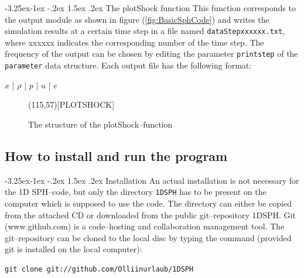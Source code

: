 \documentclass{report}
\makeatletter
\renewcommand\paragraph{\@startsection{paragraph}{4}{\z@}%
  {-3.25ex\@plus -1ex \@minus -.2ex}%
  {1.5ex \@plus .2ex}%
  {\normalfont\normalsize\bfseries}}
\makeatother
\begin{document}
\paragraph{The plotShock function}
This function corresponds to the output module as shown in figure  (\ref{fig:BasicSphCode}) and writes the simulation results at a certain time step in a file named {\tt dataStepxxxxxx.txt}, where xxxxxx indicates the corresponding number of the time step. The frequency of the output can be chosen by editing the parameter {\tt printstep} of the {\tt parameter} data structure. Each output file has the following format:

$x$ | $\rho$  |  $p$  |  $u$  |  $e$

\begin{figure}[H]
\label{fig:plotShock_structure}  

\begin{center}
\begin{struktogramm}(115,57)[PLOTSHOCK]
  \whileend
\end{struktogramm}
\end{center}

\caption{The structure of the plotShock--function}
\end{figure}

\subsection{How to install and run the program}
\paragraph{Installation}
An actual installation is not necessary for the 1D SPH--code, but only the directory {\tt 1DSPH} has to be present on the computer which is supposed to use the code. The directory can either be copied from the attached CD or downloaded from the public git--repository 1DSPH. Git (www.github.com) is a code--hosting and collaboration management tool. The git--repository can be cloned to the local disc by typing the command (provided git is installed on the local computer):
\begin{verbatim}
git clone git://github.com/Olliinurlaub/1DSPH
\end{verbatim}
\end{document}
